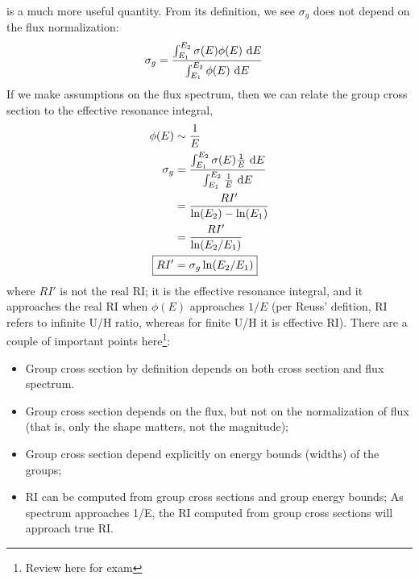 \documentclass{school-22.211-notes}
\begin{document}
 is a much more useful quantity. From its definition, we see $\sigma_g$ does not depend on the flux normalization: 
\begin{align}
\sigma_g &= \frac{\int_{E_1}^{E_2} \sigma(E) \phi(E) \mbox{ }\mathrm{d} E }{\int_{E_1}^{E_2} \phi(E) \mbox{ }\mathrm{d} E} 
\end{align}
If we make assumptions on the flux spectrum, then we can relate the group cross section to the effective resonance integral,
\begin{align}
\phi(E) &\sim \frac{1}{E} \\
\sigma_g &= \frac{\int_{E_1}^{E_2} \sigma(E) \frac{1}{E} \dE }{\int_{E_1}^{E_2} \frac{1}{E} \dE} \\
&= \frac{RI'}{\ln(E_2) - \ln(E_1)}  \\
&= \frac{RI'}{\ln(E_2/E_1)} \\
\Aboxed{ RI' &= \sigma_g \ln(E_2/E_1) }
\end{align}
where $RI'$ is not the real RI; it is the effective resonance integral, and it approaches the real RI when $\phi(E)$ approaches $1/E$ (per Reuss' defition, RI refers to infinite U/H ratio, whereas for finite U/H it is effective RI). There are a couple of important points here\footnote{Review here for exam}:
\begin{itemize}
\item Group cross section by definition depends on both cross section and flux spectrum. 
\item Group cross section depends on the flux, but not on the normalization of flux (that is, only the shape matters, not the magnitude);
\item Group cross section depend explicitly on energy bounds (widths) of the groups; 
\item RI can be computed from group cross sections and group energy bounds; As spectrum approaches 1/E, the RI computed from group cross sections will approach true RI. 
\end{itemize}
\end{document}
